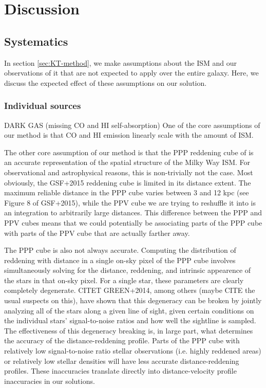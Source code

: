 \section{Discussion}
\label{sec:discussion}

\subsection{Systematics}
\label{sec:discussion-systematics}
In section \ref{sec:KT-method}, we make assumptions about the ISM and our observations of it that are not expected to apply over the entire galaxy. Here, we discuss the expected effect of these assumptions on our solution.
\subsubsection{Individual sources}
DARK GAS (missing CO and HI self-absorption)
One of the core assumptions of our method is that CO and HI emission linearly scale with the amount of ISM.

The other core assumption of our method is that the PPP reddening cube of \citet{Green_2015}  is an accurate representation of the spatial structure of the Milky Way ISM. For observational and astrophysical reasons, this is non-trivially not the case. Most obviously, the GSF+2015 reddening cube is limited in its distance extent. The maximum reliable distance in the PPP cube varies between 3 and 12 kpc (see Figure 8 of GSF+2015), while the PPV cube we are trying to reshuffle it into is an integration to arbitrarily large distances. This difference between the PPP and PPV cubes means that we could potentially be associating parts of the PPP cube with parts of the PPV cube that are actually farther away.

The PPP cube is also not always accurate. Computing the distribution of reddening with distance in a single on-sky pixel of the PPP cube involves simultaneously solving for the distance, reddening, and intrinsic appearence of the stars in that on-sky pixel. For a single star, these parameters are clearly completely degenerate. CITET GREEN+2014, among others (maybe CITE the usual suspects on this), have shown that this degeneracy can be broken by jointly analyzing all of the stars along a given line of sight, given certain conditions on the individual stars' signal-to-noise ratios and how well the sightline is sampled. The effectiveness of this degeneracy breaking is, in large part, what determines the accuracy of the distance-reddening profile. Parts of the PPP cube with relatively low signal-to-noise ratio stellar observations (i.e. highly reddened areas) or relatively low stellar densities will have less accurate distance-reddening profiles. These inaccuracies translate directly into distance-velocity profile inaccuracies in our solutions. 

